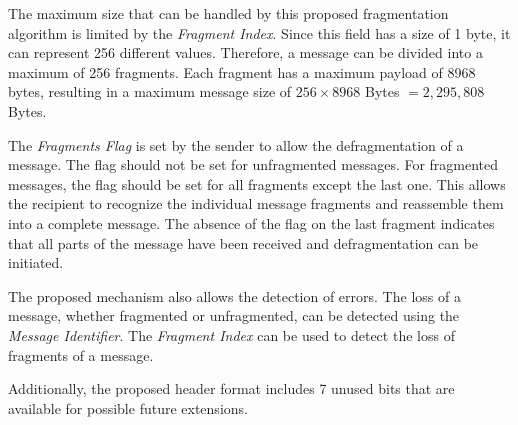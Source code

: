The maximum size that can be handled by this proposed fragmentation algorithm is limited by the \textit{Fragment Index}. Since this field has a size of 1 byte, it can represent 256 different values. Therefore, a message can be divided into a maximum of 256 fragments. Each fragment has a maximum payload of 8968 bytes, resulting in a maximum message size of $256 \times 8968$ Bytes $= 2,295,808$ Bytes.

The \textit{Fragments Flag} is set by the sender to allow the defragmentation of a message. The flag should not be set for unfragmented messages. For fragmented messages, the flag should be set for all fragments except the last one. This allows the recipient to recognize the individual message fragments and reassemble them into a complete message. The absence of the flag on the last fragment indicates that all parts of the message have been received and defragmentation can be initiated.

The proposed mechanism also allows the detection of errors. The loss of a message, whether fragmented or unfragmented, can be detected using the \textit{Message Identifier}. The \textit{Fragment Index} can be used to detect the loss of fragments of a message.

Additionally, the proposed header format includes 7 unused bits that are available for possible future extensions.